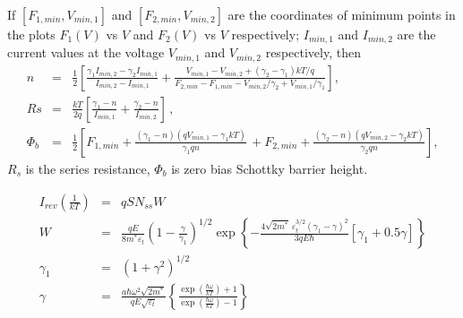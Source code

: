 \documentclass[14pt]{article}
\numberwithin{equation}{part}
\begin{document}
If $[F_{1,min}, V_{min,1}]$ and $[F_{2,min}, V_{min,2}]$ are the coordinates of minimum points in the plots $F_1(V)$ vs $V$ and $F_2(V)$ vs $V$ respectively;
$I_{min,1}$ and $I_{min,2}$ are the current values at the voltage $V_{min,1}$ and $V_{min,2}$ respectively, then
\begin{eqnarray}
\label{eqBohlinDet}
n&=&\frac{1}{2}\left[\frac{\gamma_1I_{min,2}-\gamma_2I_{min,1}}{I_{min,2}-I_{min,1}}+
\frac{V_{min,1}-V_{min,2}+(\gamma_2-\gamma_1)kT/q}{F_{2,min}-F_{1,min}-V_{min,2}/\gamma_2+V_{min,1}/\gamma_1}\right]
,\nonumber
\\
Rs&=&\frac{kT}{2q}\left[\frac{\gamma_1-n}{I_{min,1}}+\frac{\gamma_2-n}{I_{min,2}}\right]\,,\nonumber
\\
\Phi_b&=&\frac{1}{2}\left[F_{1,min}+\frac{(\gamma_1-n)(qV_{min,1}-\gamma_1kT)}{\gamma_1qn}\,+
F_{2,min}+\frac{(\gamma_2-n)(qV_{min,2}-\gamma_2kT)}{\gamma_2qn}\right],\nonumber
\end{eqnarray}
$R_s$ is the series resistance,
$\Phi_b$ is zero bias Schottky barrier height.

\pagebreak

\begin{eqnarray*}
    I_{rev}\left(\frac{1}{kT}\right)&=&qSN_{ss}W \\
    W&=&\frac{qE}{8m^*\varepsilon_t}\left(1-\frac{\gamma}{\gamma_1}\right)^{1/2}\exp
    \left\{-\frac{4\sqrt{2m^*}\,\varepsilon_t^{3/2}\left(\gamma_1-\gamma\right)^2}{3qE\hbar}
    [\gamma_1+0.5\gamma]\right\}\\
    \gamma_1&=&(1+\gamma^2)^{1/2}\\
    \gamma&=&\frac{a\hbar\omega^2\sqrt{2m^*}}{qE\sqrt{\varepsilon_t}}
    \left\{\frac{\exp\left(\frac{\hbar\omega}{kT}\right)+1}{\exp\left(\frac{\hbar\omega}{kT}\right)-1}\right\}\\
\end{eqnarray*}
\end{document}
